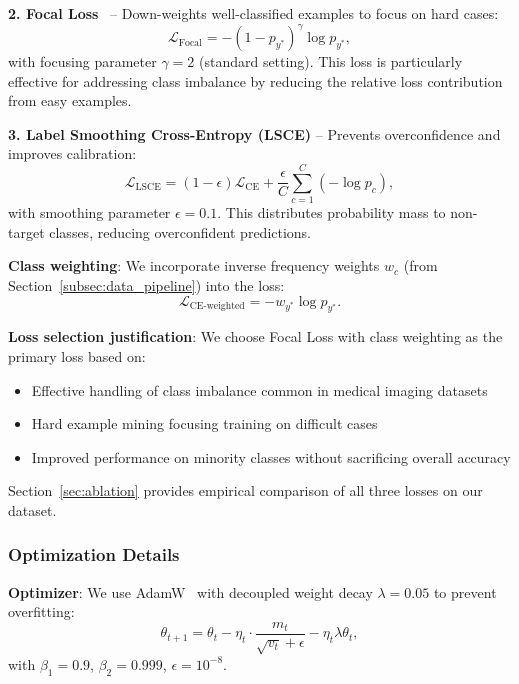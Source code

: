 \textbf{2. Focal Loss}~\cite{lin2017focal} -- Down-weights well-classified examples to focus on hard cases:
\begin{equation}
\mathcal{L}_{\text{Focal}} = -(1-p_{y^*})^\gamma \log p_{y^*},
\end{equation}
with focusing parameter $\gamma=2$ (standard setting). This loss is particularly effective for addressing class imbalance by reducing the relative loss contribution from easy examples.

\textbf{3. Label Smoothing Cross-Entropy (LSCE)} -- Prevents overconfidence and improves calibration:
\begin{equation}
\mathcal{L}_{\text{LSCE}} = (1-\epsilon)\mathcal{L}_{\text{CE}} + \frac{\epsilon}{C}\sum_{c=1}^{C} (-\log p_c),
\end{equation}
with smoothing parameter $\epsilon = 0.1$. This distributes probability mass to non-target classes, reducing overconfident predictions.

\textbf{Class weighting}: We incorporate inverse frequency weights $w_c$ (from Section~\ref{subsec:data_pipeline}) into the loss:
\begin{equation}
\mathcal{L}_{\text{CE-weighted}} = -w_{y^*} \log p_{y^*}.
\end{equation}

\textbf{Loss selection justification}: We choose Focal Loss with class weighting as the primary loss based on:
\begin{itemize}
    \item Effective handling of class imbalance common in medical imaging datasets
    \item Hard example mining focusing training on difficult cases~\cite{lin2017focal}
    \item Improved performance on minority classes without sacrificing overall accuracy
\end{itemize}

Section~\ref{sec:ablation} provides empirical comparison of all three losses on our dataset.

\subsubsection{Optimization Details}

\textbf{Optimizer}: We use AdamW~\cite{loshchilov2019adamw} with decoupled weight decay $\lambda = 0.05$ to prevent overfitting:
\begin{equation}
\theta_{t+1} = \theta_t - \eta_t \cdot \frac{m_t}{\sqrt{v_t} + \epsilon} - \eta_t \lambda \theta_t,
\end{equation}
with $\beta_1 = 0.9$, $\beta_2 = 0.999$, $\epsilon = 10^{-8}$.

